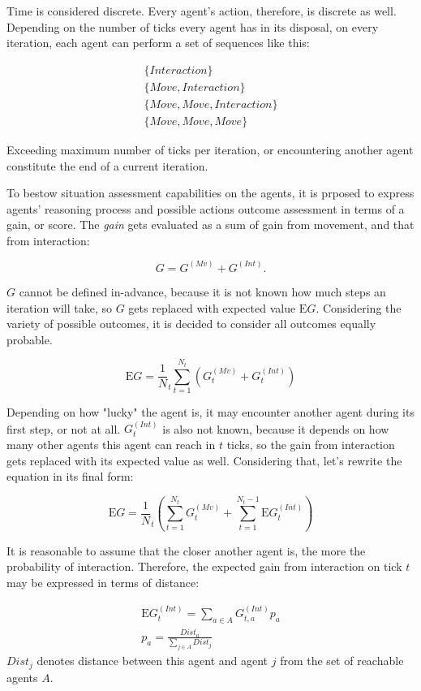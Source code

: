 Time is considered discrete. Every agent's action, therefore, is discrete as well. Depending on the number of ticks
every agent has in its disposal, on every iteration, each agent can perform a set of sequences like this:

$$
    \begin{gathered}
        \{Interaction\}\\
        \{Move, Interaction\}\\
        \{Move, Move, Interaction\}\\
        \{Move, Move, Move\}
    \end{gathered}
$$

Exceeding maximum number of ticks per iteration, or encountering another agent constitute the end of a current iteration.

To bestow situation assessment capabilities on the agents, it is prposed to express agents' reasoning process and
possible actions outcome assessment in terms of a gain, or score. The \textit{gain} gets evaluated as a sum of gain from
movement, and that from interaction:

$$
G = G^{(Mv)} + G^{(Int)}.
$$

$G$ cannot be defined in-advance, because it is not known how much steps an iteration will take, so $G$ gets replaced
with expected value $\mathrm{E}G$. Considering the variety of possible outcomes, it is decided to consider all outcomes
equally probable.

$$
    \mathrm{E}G = \frac 1 N_t \sum_{t=1}^{N_t}{(G^{(Mv)}_t + G^{(Int)}_t)}
$$

Depending on how "lucky" the agent is, it may encounter another agent during its first step, or not at all.
$G^{(Int)}_t$ is also not known, because it depends on how many other agents this agent can reach in $t$ ticks, so the
gain from interaction gets replaced with its expected value as well. Considering that, let's rewrite the equation in its
final form:

\begin{equation}
    \mathrm{E}{G} = \frac 1 N_t (\sum_{t=1}^{N_t}{G^{(Mv)}_t} + \sum_{t=1}^{N_t - 1}{\mathrm{E}G^{(Int)}_t})
\end{equation}

It is reasonable to assume that the closer another agent is, the more the probability of interaction. Therefore, the
expected gain from interaction on tick $t$ may be expressed in terms of distance:

\begin{equation}\label{eq:expected-gain}
    \begin{gathered}
        \mathrm{E}G^{(Int)}_t = \sum_{a \in A}{G^{(Int)}_{t,a}p_{a}}\\
        p_{a} = \frac {Dist_a} {\sum_{j \in A}{Dist_j}}
    \end{gathered}
\end{equation}
$Dist_j$ denotes distance between this agent and agent $j$ from the set of reachable agents $A$.
